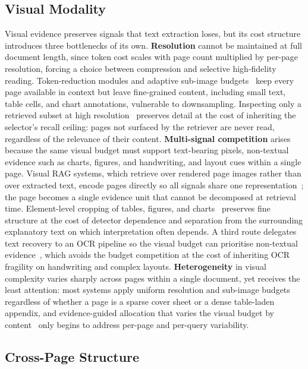 \documentclass[11pt]{article}
\begin{document}
\subsection{Visual Modality}
\label{sec:modality-visual}

Visual evidence preserves signals that text extraction loses, but its cost structure introduces three bottlenecks of its own. \textbf{Resolution} cannot be maintained at full document length, since token cost scales with page count multiplied by per-page resolution, forcing a choice between compression and selective high-fidelity reading. Token-reduction modules and adaptive sub-image budgets~\cite{hu2025mplugdocowl2,yu2024texthawk2,jia2024leopard} keep every page available in context but leave fine-grained content, including small text, table cells, and chart annotations, vulnerable to downsampling. Inspecting only a retrieved subset at high resolution~\cite{zhu2025doclens,jain2025simpledoc} preserves detail at the cost of inheriting the selector's recall ceiling: pages not surfaced by the retriever are never read, regardless of the relevance of their content. \textbf{Multi-signal competition} arises because the same visual budget must support text-bearing pixels, non-textual evidence such as charts, figures, and handwriting, and layout cues within a single page. Visual RAG systems, which retrieve over rendered page images rather than over extracted text, encode pages directly so all signals share one representation~\cite{cho2024m3docrag,tanaka2025vdocrag}; the page becomes a single evidence unit that cannot be decomposed at retrieval time. Element-level cropping of tables, figures, and charts~\cite{zhu2025doclens} preserves fine structure at the cost of detector dependence and separation from the surrounding explanatory text on which interpretation often depends. A third route delegates text recovery to an OCR pipeline so the visual budget can prioritise non-textual evidence~\cite{hannan2025docslm}, which avoids the budget competition at the cost of inheriting OCR fragility on handwriting and complex layouts. \textbf{Heterogeneity} in visual complexity varies sharply across pages within a single document, yet receives the least attention: most systems apply uniform resolution and sub-image budgets regardless of whether a page is a sparse cover sheet or a dense table-laden appendix, and evidence-guided allocation that varies the visual budget by content~\cite{jia2024leopard} only begins to address per-page and per-query variability.

\subsection{Cross-Page Structure}
\label{sec:modality-structure}
\end{document}
